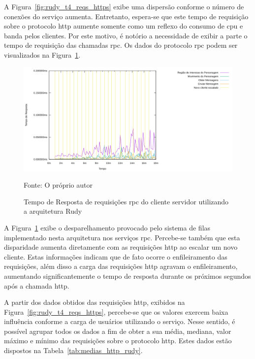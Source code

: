 A Figura~\ref{fig:rudy_t4_reqs_https} exibe uma dispersão conforme o número de conexões do serviço aumenta.
%
Entretanto, espera-se que este tempo de requisição sobre o protocolo \ac{http} aumente somente como um reflexo do consumo de \ac{cpu} e banda pelos clientes.
%
Por este motivo, é notório a necessidade de exibir a parte o tempo de requisição das chamadas \ac{rpc}.
%
Os dados do protocolo \ac{rpc} podem ser visualizados na Figura~\ref{fig:rudy_t4_reqs_rpc}.

\begin{figure}[htb!]
    \caption{Tempo de Resposta de requisições \ac{rpc} do cliente servidor utilizando a arquitetura Rudy}
    \label{fig:rudy_t4_reqs_rpc}
    \includegraphics[width=\textwidth]{metricas_rudy_t4/rudyc_rpc.png}
    \centering
    
    Fonte: O próprio autor
\end{figure}

A Figura~\ref{fig:rudy_t4_reqs_rpc} exibe o desparelhamento provocado pelo sistema de filas implementado nesta arquitetura nos serviços \ac{rpc}.
%
Percebe-se também que esta disparidade aumenta diretamente com as requisições \ac{http} ao escalar um novo cliente.
%
Estas informações indicam que de fato ocorre o enfileiramento das requisições, além disso a carga das requisições \ac{http} agravam o enfileiramento, aumentando significantemente o tempo de resposta durante os próximos segundos após a chamada \ac{http}.

A partir dos dados obtidos das requisições \ac{http}, exibidos na Figura~\ref{fig:rudy_t4_reqs_https}, percebe-se que os valores exercem baixa influência conforme a carga de usuários utilizando o serviço.
%
Nesse sentido, é possível agrupar todos os dados a fim de obter a sua média, mediana, valor máximo e mínimo das requisições sobre o protocolo \ac{http}.
%
Estes dados estão dispostos na Tabela~\ref{tab:medias_http_rudy}.

